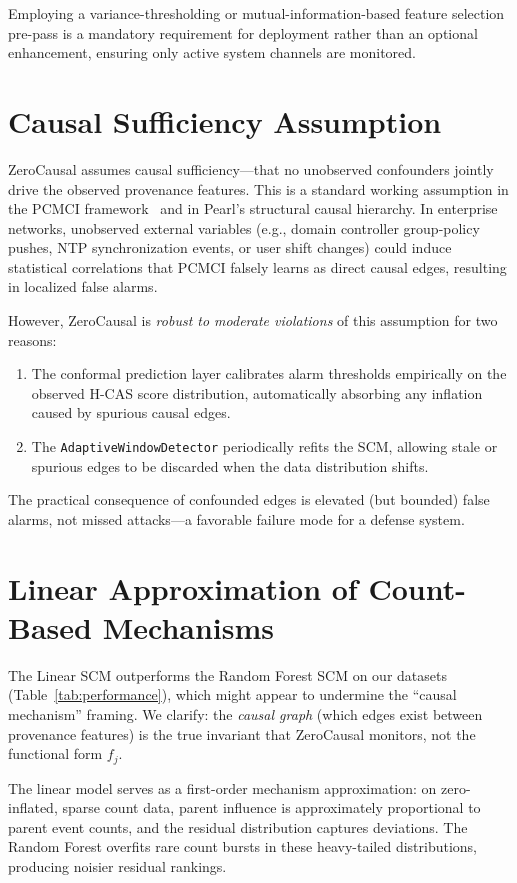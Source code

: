 Employing a variance-thresholding or mutual-information-based feature selection pre-pass is a mandatory requirement for deployment rather than an optional enhancement, ensuring only active system channels are monitored.

\section{Causal Sufficiency Assumption}

ZeroCausal assumes causal sufficiency---that no unobserved confounders jointly drive the observed provenance features. This is a standard working assumption in the PCMCI framework~\cite{pcmci2019} and in Pearl's structural causal hierarchy. In enterprise networks, unobserved external variables (e.g., domain controller group-policy pushes, NTP synchronization events, or user shift changes) could induce statistical correlations that PCMCI falsely learns as direct causal edges, resulting in localized false alarms.

However, ZeroCausal is \textit{robust to moderate violations} of this assumption for two reasons:
\begin{enumerate}
\item The conformal prediction layer calibrates alarm thresholds empirically on the observed H-CAS score distribution, automatically absorbing any inflation caused by spurious causal edges.
\item The \texttt{AdaptiveWindowDetector} periodically refits the SCM, allowing stale or spurious edges to be discarded when the data distribution shifts.
\end{enumerate}

The practical consequence of confounded edges is elevated (but bounded) false alarms, not missed attacks---a favorable failure mode for a defense system.

\section{Linear Approximation of Count-Based Mechanisms}

The Linear SCM outperforms the Random Forest SCM on our datasets (Table~\ref{tab:performance}), which might appear to undermine the ``causal mechanism'' framing. We clarify: the \textit{causal graph} (which edges exist between provenance features) is the true invariant that ZeroCausal monitors, not the functional form $f_j$.

The linear model serves as a first-order mechanism approximation: on zero-inflated, sparse count data, parent influence is approximately proportional to parent event counts, and the residual distribution captures deviations. The Random Forest overfits rare count bursts in these heavy-tailed distributions, producing noisier residual rankings.

